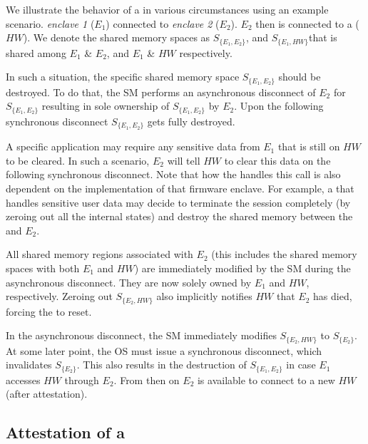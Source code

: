 We illustrate the behavior of a \nameenclave{} in various circumstances using an example scenario. \emph{enclave 1} ($E_1$) connected to \emph{enclave 2} ($E_2$). $E_2$ then is connected to a \sphw ($HW$). We denote the shared memory spaces as $S_{\{E_1, E_2\}}$, and $S_{\{E_1, HW\}}$that is shared among $E_1$ \& $E_2$, and $E_1$ \& $HW$ respectively.

\setcounter{para}{0}

 In such a situation, the specific shared memory space $S_{\{E_1, E_2\}}$ should be destroyed. To do that, the SM performs an asynchronous disconnect of $E_2$ for $S_{\{E_1, E_2\}}$ resulting in sole ownership of $S_{\{E_1, E_2\}}$ by $E_2$. Upon the following synchronous disconnect $S_{\{E_1, E_2\}}$ gets fully destroyed.

A specific application may require any sensitive data from $E_1$ that is still on $HW$ to be cleared. In such a scenario, $E_2$ will tell $HW$ to clear this data on the following synchronous disconnect. Note that how the \sphw handles this call is also dependent on the implementation of that \sphw firmware enclave. For example, a \sphw that handles sensitive user data may decide to terminate the session completely (by zeroing out all the internal states) and destroy the shared memory between the \sphw and $E_2$.

    
 All shared memory regions associated with $E_2$ (this includes the shared memory spaces with both $E_1$ and $HW$) are immediately modified by the SM during the asynchronous disconnect. They are now solely owned by $E_1$ and $HW$, respectively. Zeroing out $S_{\{E_2, HW\}}$ also implicitly notifies $HW$ that $E_2$ has died, forcing the \sphw to reset.
    
 In the asynchronous disconnect, the SM immediately modifies $S_{\{E_2, HW\}}$ to $S_{\{E_2\}}$. At some later point, the OS must issue a synchronous disconnect, which invalidates $S_{\{E_2\}}$. This also results in the destruction of $S_{\{E_1, E_2\}}$ in case $E_1$ accesses $HW$ through $E_2$. From then on $E_2$ is available to connect to a new $HW$ (after attestation).

\setcounter{para}{0}

\subsection{Attestation of a \nameenclave{}}
\label{sec:approach:attestation}

